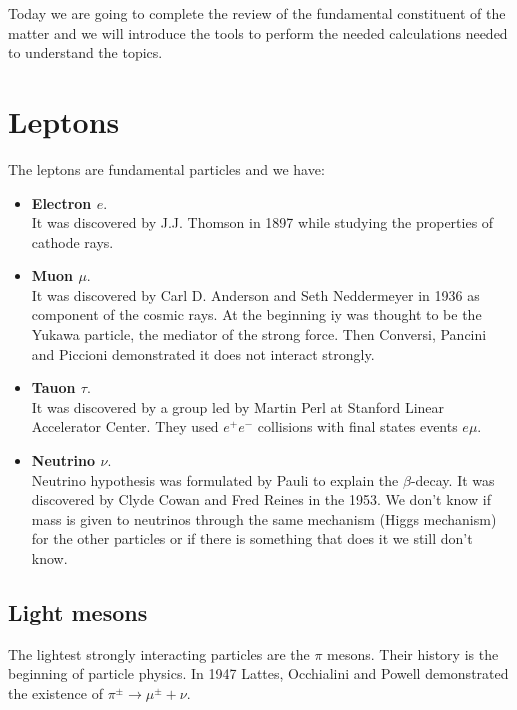 \documentclass[../../main/main.tex]{subfiles}
\begin{document}

Today we are going to complete the review of the fundamental constituent of the matter and we will introduce the tools to perform the needed calculations needed to understand the topics.

\section{Leptons}
The leptons are fundamental particles and we have:
\begin{itemize}
    \item \textbf{Electron \( e \)}.\\
        It was discovered by J.J. Thomson in 1897 while studying the properties of cathode rays.
    \item \textbf{Muon \( \mu \)}.\\
        It was discovered by Carl D. Anderson and Seth Neddermeyer in 1936 as component of the cosmic rays. At the beginning iy was thought to be the Yukawa particle, the mediator of the strong force. Then Conversi, Pancini and Piccioni demonstrated it does not interact strongly.
    \item \textbf{Tauon \( \tau \)}.\\
        It was discovered by a group led by Martin Perl at Stanford Linear Accelerator Center. They used \( e^+e^- \) collisions with final states events \( e\mu \).
    \item \textbf{Neutrino \( \nu \)}.\\
        Neutrino hypothesis was formulated by Pauli to explain the \( \beta \)-decay. It was discovered by Clyde Cowan and Fred Reines in the 1953. We don't know if mass is given to neutrinos through the same mechanism (Higgs mechanism) for the other particles or if there is something that does it we still don't know.
\end{itemize}



\subsection{Light mesons}
The lightest strongly interacting particles are the \( \pi \) mesons. Their history is the beginning of particle physics. In 1947 Lattes, Occhialini and Powell demonstrated the existence of \( \pi^{\pm} \longrightarrow \mu^{\pm} + \nu \).
\end{document}
